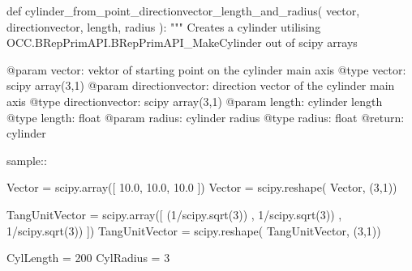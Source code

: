 \begin{python}[moreemph={[4], 46, 48},caption={Step3\_2.py - Defining a cylinder from a point, a direction vector, the length and the radius},label=LISTING_STEP3_2_PY_A]
def cylinder_from_point_directionvector_length_and_radius(  vector, 
                                                            directionvector,
                                                            length,
                                                            radius ):
    """
    Creates a cylinder utilising OCC.BRepPrimAPI.BRepPrimAPI_MakeCylinder out 
    of scipy arrays
    
    @param vector: vektor of starting point on the cylinder main axis
    @type  vector: scipy array(3,1)
    @param directionvector: direction vector of the cylinder main axis
    @type  directionvector: scipy array(3,1)
    @param length: cylinder length
    @type  length: float
    @param radius: cylinder radius
    @type  radius: float
    @return: cylinder

    sample::
    
        Vector = scipy.array([ 10.0, 10.0, 10.0 ])
        Vector = scipy.reshape( Vector, (3,1))
        
        TangUnitVector = scipy.array([  (1/scipy.sqrt(3)) , 
                                         1/scipy.sqrt(3)) , 
                                         1/scipy.sqrt(3)) ])
        TangUnitVector = scipy.reshape( TangUnitVector, (3,1))

        CylLength = 200
        CylRadius = 3
    

\end{python}
